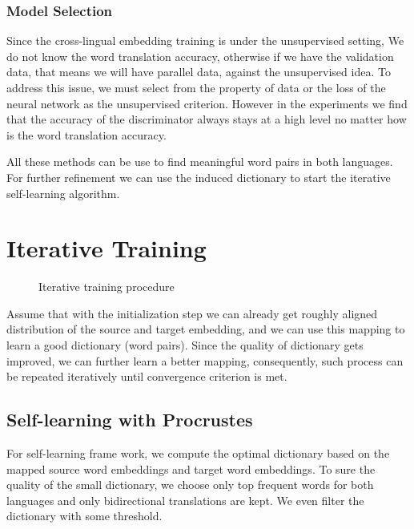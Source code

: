 \subsubsection{Model Selection}
Since the cross-lingual embedding training is under the unsupervised setting, We do not know the word translation accuracy, otherwise if we have the validation data, that means we will have parallel data, against the unsupervised idea. To address this issue, we must select from the property of data or the loss of the neural network as the unsupervised criterion. However in the experiments we find that the accuracy of the discriminator always stays at a high level no matter how is the word translation accuracy. 

All these methods can be use to find meaningful word pairs in both languages. For further refinement we can use the induced dictionary to start the iterative self-learning algorithm. 


\section{Iterative Training}
\begin{figure}[h]
	\centering
	\begin{minipage}{.7\linewidth}
		\begin{algorithm}[H]
			\SetAlgoLined
			
			\caption{Iterative training procedure}
		\end{algorithm}
	\end{minipage}
\end{figure}
Assume that with the initialization step we can already get roughly aligned distribution of the source and target embedding, and we can use this mapping to learn a good dictionary (word pairs). Since the quality of dictionary gets improved, we can further learn a better mapping, consequently, such process can be repeated iteratively until convergence criterion is met.
\subsection{Self-learning with Procrustes}
For self-learning frame work, we compute the optimal dictionary based on the mapped source word embeddings and target word embeddings. To sure the quality of the small dictionary, we choose only top frequent words for both languages and only bidirectional translations are kept. We even filter the dictionary with some threshold.


